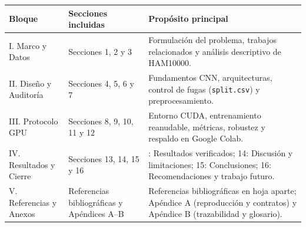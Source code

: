 \documentclass[10pt,a4paper]{article}
\begin{document}
\begin{center}
\small
\begin{tabularx}{\textwidth}{@{}>{\raggedright\arraybackslash}p{2.9cm}>{\raggedright\arraybackslash}p{4.8cm}>{\raggedright\arraybackslash}X@{}}
\toprule
\textbf{Bloque} & \textbf{Secciones incluidas} & \textbf{Propósito principal} \\ \midrule
I. Marco y Datos & Secciones 1, 2 y 3 & Formulación del problema, trabajos relacionados y análisis descriptivo de HAM10000. \\
II. Diseño y Auditoría & Secciones 4, 5, 6 y 7 & Fundamentos CNN, arquitecturas, control de fugas (\texttt{split.csv}) y preprocesamiento. \\
III. Protocolo GPU & Secciones 8, 9, 10, 11 y 12 & Entorno CUDA, entrenamiento reanudable, métricas, robustez y respaldo en Google Colab. \\
IV. Resultados y Cierre & Secciones 13, 14, 15 y 16 & 13: Resultados verificados; 14: Discusión y limitaciones; 15: Conclusiones; 16: Recomendaciones y trabajo futuro. \\
V. Referencias y Anexos & Referencias bibliográficas y Apéndices A--B & Referencias bibliográficas en hoja aparte; Apéndice A (reproducción y contratos) y Apéndice B (trazabilidad y glosario). \\
\bottomrule
\end{tabularx}
\end{center}

\clearpage
{\setlength{\parskip}{0pt}%
\tableofcontents}

\clearpage
{\setlength{\parskip}{0pt}%
\listoffigures}

\clearpage
{\setlength{\parskip}{0pt}%
\listoftables}

\clearpage
{}


















\FloatBarrier
\clearpage
\renewcommand{\refname}{Referencias bibliográficas}
{}



\clearpage
\appendix
{}

\clearpage

\end{document}

